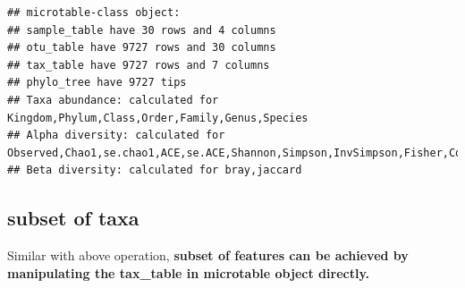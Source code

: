 \documentclass[
]{book}
\newenvironment{Shaded}{\begin{snugshade}}{\end{snugshade}}
\newcommand{\CommentTok}[1]{\textcolor[rgb]{0.56,0.35,0.01}{\textit{#1}}}
\newcommand{\FunctionTok}[1]{\textcolor[rgb]{0.00,0.00,0.00}{#1}}
\newcommand{\NormalTok}[1]{#1}
\newcommand{\OtherTok}[1]{\textcolor[rgb]{0.56,0.35,0.01}{#1}}
\newcommand{\SpecialCharTok}[1]{\textcolor[rgb]{0.00,0.00,0.00}{#1}}
\newcommand{\StringTok}[1]{\textcolor[rgb]{0.31,0.60,0.02}{#1}}
\begin{document}
\begin{Shaded}
\end{Shaded}

\begin{verbatim}
## microtable-class object:
## sample_table have 30 rows and 4 columns
## otu_table have 9727 rows and 30 columns
## tax_table have 9727 rows and 7 columns
## phylo_tree have 9727 tips
## Taxa abundance: calculated for Kingdom,Phylum,Class,Order,Family,Genus,Species 
## Alpha diversity: calculated for Observed,Chao1,se.chao1,ACE,se.ACE,Shannon,Simpson,InvSimpson,Fisher,Coverage 
## Beta diversity: calculated for bray,jaccard
\end{verbatim}

\hypertarget{subset-of-taxa}{%
\subsection{subset of taxa}\label{subset-of-taxa}}

Similar with above operation, \textbf{subset of features can be achieved by manipulating the tax\_table in microtable object directly.}

\begin{Shaded}
\end{Shaded}
\end{document}
